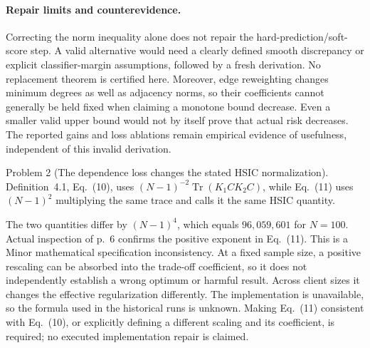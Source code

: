 \documentclass[10pt]{article}
\begin{document}
\paragraph*{Repair limits and counterevidence.}\mbox{}\par
Correcting the norm inequality alone does not repair the hard-prediction/soft-score step. A valid alternative would need a clearly defined smooth discrepancy or explicit classifier-margin assumptions, followed by a fresh derivation. No replacement theorem is certified here. Moreover, edge reweighting changes minimum degrees as well as adjacency norms, so their coefficients cannot generally be held fixed when claiming a monotone bound decrease. Even a smaller valid upper bound would not by itself prove that actual risk decreases. The reported gains and loss ablations remain empirical evidence of usefulness, independent of this invalid derivation.\par
Problem 2 (The dependence loss changes the stated HSIC normalization).  Definition 4.1, Eq. (10), uses \((N-1)^{-2}\operatorname{Tr}(K_1CK_2C)\), while Eq. (11) uses \((N-1)^2\) multiplying the same trace and calls it the same HSIC quantity.\par
The two quantities differ by \((N-1)^4\), which equals \(96{,}059{,}601\) for \(N=100\). Actual inspection of p. 6 confirms the positive exponent in Eq. (11). This is a Minor mathematical specification inconsistency. At a fixed sample size, a positive rescaling can be absorbed into the trade-off coefficient, so it does not independently establish a wrong optimum or harmful result. Across client sizes it changes the effective regularization differently. The implementation is unavailable, so the formula used in the historical runs is unknown. Making Eq. (11) consistent with Eq. (10), or explicitly defining a different scaling and its coefficient, is required; no executed implementation repair is claimed.\par
\end{document}
